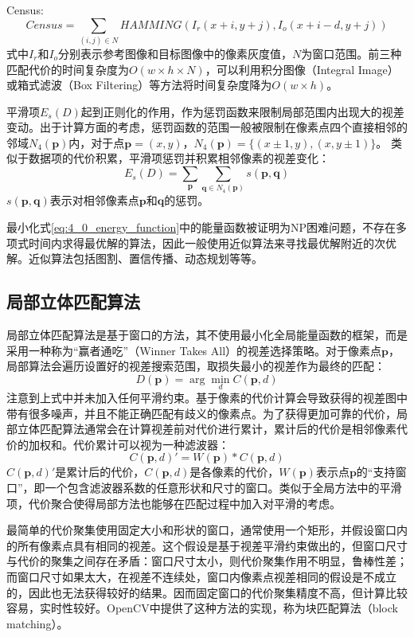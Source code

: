 Census:
\[  Census = \sum_ {(i,j) \in N} HAMMING(I_r(x+i,y+j), I_o(x+i-d, y+j))   \]
式中$I_r$和$I_o$分别表示参考图像和目标图像中的像素灰度值，$N$为窗口范围。前三种匹配代价的时间复杂度为$O(w\times h \times N)$，可以利用积分图像（Integral Image）或箱式滤波（Box Filtering）等方法将时间复杂度降为$O(w \times h)$。

平滑项$E_s(D)$起到正则化的作用，作为惩罚函数来限制局部范围内出现大的视差变动。出于计算方面的考虑，惩罚函数的范围一般被限制在像素点四个直接相邻的邻域$N_4(\mathbf{p})$内，对于点$\mathbf{p}=(x,y)$，$N_4(\mathbf{p}) = \{ (x \pm 1, y), (x, y \pm 1) \}$。 类似于数据项的代价积累，平滑项惩罚并积累相邻像素的视差变化：
\[  E_s(D) = \sum_{\mathbf{p}} \sum_{\mathbf{q} \in N_4(\mathbf{p})} s(\mathbf{p}, \mathbf{q})    \]
$s(\mathbf{p}, \mathbf{q})$表示对相邻像素点$\mathbf{p}$和$\mathbf{q}$的惩罚。

最小化式\ref{eq:4_0_energy_function}中的能量函数被证明为NP困难问题\cite{boykov2001fast}，不存在多项式时间内求得最优解的算法，因此一般使用近似算法来寻找最优解附近的次优解。近似算法包括图割\cite{boykov2001fast}、置信传播\cite{sun2003stereo}、动态规划\cite{VanMeerbergen2002}等等。

\subsection{局部立体匹配算法}
局部立体匹配算法是基于窗口的方法，其不使用最小化全局能量函数的框架，而是采用一种称为“赢者通吃”（Winner Takes All）的视差选择策略。对于像素点$\mathbf{p}$，局部算法会遍历设置好的视差搜索范围，取损失最小的视差作为最终的匹配：
%
\begin{equation} \label{eq:4_0_local_WTA}
D(\mathbf{p}) = \arg \min_d C(\mathbf{p}, d)
\end{equation}
注意到上式中并未加入任何平滑约束。基于像素的代价计算会导致获得的视差图中带有很多噪声，并且不能正确匹配有歧义的像素点。为了获得更加可靠的代价，局部立体匹配算法通常会在计算视差前对代价进行累计，累计后的代价是相邻像素代价的加权和。代价累计可以视为一种滤波器：
%
\begin{equation} \label{eq:4_0_local_cost_aggregation}
C(\mathbf{p}, d)' = W(\mathbf{p}) * C(\mathbf{p}, d)
\end{equation}
$C(\mathbf{p}, d)' $是累计后的代价，$C(\mathbf{p}, d)$是各像素的代价，$W(\mathbf{p})$表示点$\mathbf{p}$的“支持窗口”，即一个包含滤波器系数的任意形状和尺寸的窗口。类似于全局方法中的平滑项，代价聚合使得局部方法也能够在匹配过程中加入对平滑的考虑。

最简单的代价聚集使用固定大小和形状的窗口，通常使用一个矩形，并假设窗口内的所有像素点具有相同的视差。这个假设是基于视差平滑约束做出的，但窗口尺寸与代价的聚集之间存在矛盾：窗口尺寸太小，则代价聚集作用不明显，鲁棒性差；而窗口尺寸如果太大，在视差不连续处，窗口内像素点视差相同的假设是不成立的，因此也无法获得较好的结果。因而固定窗口的代价聚集精度不高，但计算比较容易，实时性较好。OpenCV中提供了这种方法的实现，称为块匹配算法（block matching）。


